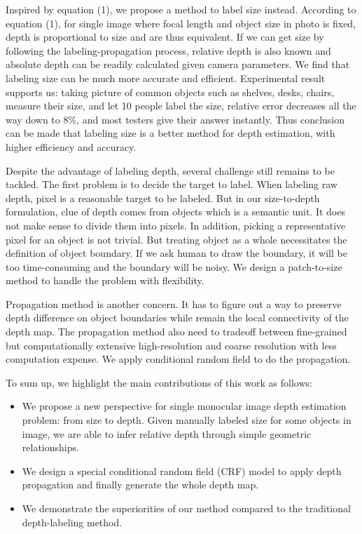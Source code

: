 \documentclass[10pt,twocolumn,letterpaper]{article}
\begin{document}
Inspired by equation (1), we propose a method to label size instead. According to equation (1), for single image where focal length and object size in photo is fixed, depth is proportional to size and are thus equivalent. If we can get size by following the labeling-propagation process, relative depth is also known and absolute depth can be readily calculated given camera parameters. We find that labeling size can be much more accurate and efficient. Experimental result supports us: taking picture of common objects such as shelves, desks, chairs, measure their size, and let 10 people label the size, relative error decreases all the way down to 8\%, and most testers give their answer instantly. Thus conclusion can be made that labeling size is a better method for depth estimation, with higher efficiency and accuracy. 

Despite the advantage of labeling depth, several challenge still remains to be tackled. The first problem is to decide the target to label. When labeling raw depth, pixel is a reasonable target to be labeled. But in our size-to-depth formulation, clue of depth comes from objects which is a semantic unit. It does not make sense to divide them into pixels. In addition, picking a representative pixel for an object is not trivial. But treating object as a whole necessitates the definition of object boundary. If we ask human to draw the boundary, it will be too time-consuming and the boundary will be noisy. We design a patch-to-size method to handle the problem with flexibility.

Propagation method is another concern. It has to figure out a way to preserve depth difference on object boundaries while remain the local connectivity of the depth map. The propagation method also need to tradeoff between fine-grained but computationally extensive high-resolution and coarse resolution with less computation expense. We apply conditional random field to do the propagation.

To sum up, we highlight the main contributions of this work as follows:
\begin{itemize}
\item We propose a new perspective for single monocular image depth estimation problem: from size to depth. Given manually labeled size for some objects in image, we are able to infer relative depth through simple geometric relationships. 
\item We design a special conditional random field (CRF) model to apply depth propagation and finally generate the whole depth map.
\item We demonstrate the superiorities of our method compared to the traditional depth-labeling method.
\end{itemize}
\end{document}
